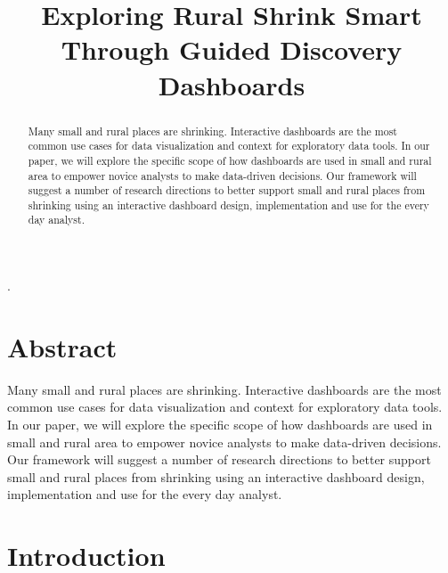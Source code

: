 \documentclass[letterpaper,inpress]{jdsart}
\begin{document}
\begin{frontmatter}

\title{Exploring Rural Shrink Smart Through Guided Discovery Dashboards}


\author[1]{
  }
\author[1]{
      }

\address[1]{Department of Statistics, 
  , }

\begin{abstract}
Many small and rural places are shrinking. Interactive dashboards are the most common use cases for data visualization and context for exploratory data tools. In our paper, we will explore the specific scope of how dashboards are used in small and rural area to empower novice analysts to make data-driven decisions. Our framework will suggest a number of research directions to better support small and rural places from shrinking using an interactive dashboard design, implementation and use for the every day analyst.
\end{abstract}

\begin{keywords}
.
\end{keywords}

\end{frontmatter}

\hypertarget{abstract}{%
\section{Abstract}\label{abstract}}

Many small and rural places are shrinking. Interactive dashboards are the most common use cases for data visualization and context for exploratory data tools. In our paper, we will explore the specific scope of how dashboards are used in small and rural area to empower novice analysts to make data-driven decisions. Our framework will suggest a number of research directions to better support small and rural places from shrinking using an interactive dashboard design, implementation and use for the every day analyst.

\hypertarget{introduction}{%
\section{Introduction}\label{introduction}}
\end{document}
